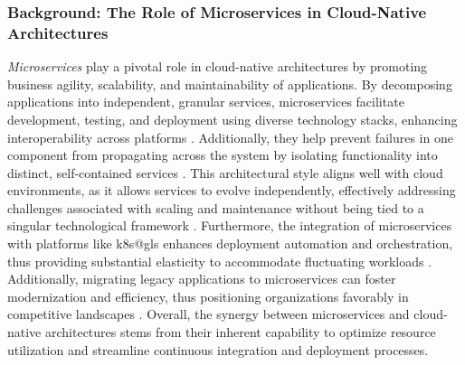 \documentclass[11pt, a4paper, oneside, listof=totoc]{scrartcl}
\begin{document}
            \subsubsection{Background: The Role of Microservices in Cloud-Native Architectures}\label{subsubsec:microservices}
                \textit{Microservices} play a pivotal role in cloud-native architectures by
                promoting business agility, scalability, and maintainability of applications.
                By decomposing applications into independent, granular services, microservices
                facilitate development, testing, and deployment using diverse technology stacks,
                enhancing interoperability across platforms
                \parencites[p.~1]{waseem2020}[p.~1]{larrucea2018}.
                Additionally, they help prevent failures in one component from propagating across
                the system by isolating functionality into distinct, self-contained services
                \parencite[p.~62]{davis2019}.
                This architectural style aligns well with cloud environments, as it allows services
                to evolve independently, effectively addressing challenges associated with scaling
                and maintenance without being tied to a singular technological framework
                \parencite[pp.~202--203]{balalaie2016}.
                Furthermore, the integration of microservices with platforms like \gls{k8s@gls}
                enhances deployment automation and orchestration, thus providing substantial
                elasticity to accommodate fluctuating workloads \parencite[p.~170]{haugeland2021}.
                Additionally, migrating legacy applications to microservices can foster
                modernization and efficiency, thus positioning organizations favorably in
                competitive landscapes \parencite[p.~214]{balalaie2016}.
                Overall, the synergy between microservices and cloud-native architectures stems from
                their inherent capability to optimize resource utilization and streamline continuous
                integration and deployment processes.
\end{document}
